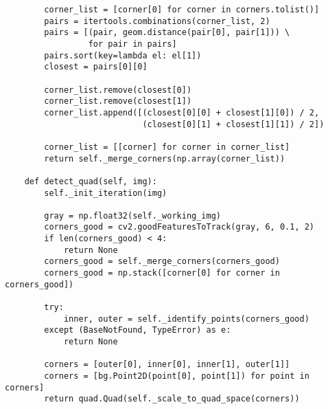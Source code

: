 \begin{verbatim}
        corner_list = [corner[0] for corner in corners.tolist()]
        pairs = itertools.combinations(corner_list, 2)
        pairs = [(pair, geom.distance(pair[0], pair[1])) \
                 for pair in pairs]
        pairs.sort(key=lambda el: el[1])
        closest = pairs[0][0]
        
        corner_list.remove(closest[0])
        corner_list.remove(closest[1])
        corner_list.append([(closest[0][0] + closest[1][0]) / 2,
                            (closest[0][1] + closest[1][1]) / 2])
        
        corner_list = [[corner] for corner in corner_list]
        return self._merge_corners(np.array(corner_list))
    
    def detect_quad(self, img):
        self._init_iteration(img)
        
        gray = np.float32(self._working_img)
        corners_good = cv2.goodFeaturesToTrack(gray, 6, 0.1, 2)
        if len(corners_good) < 4:
            return None
        corners_good = self._merge_corners(corners_good)
        corners_good = np.stack([corner[0] for corner in corners_good])
        
        try:
            inner, outer = self._identify_points(corners_good)
        except (BaseNotFound, TypeError) as e:
            return None
        
        corners = [outer[0], inner[0], inner[1], outer[1]]
        corners = [bg.Point2D(point[0], point[1]) for point in corners]
        return quad.Quad(self._scale_to_quad_space(corners))
\end{verbatim}